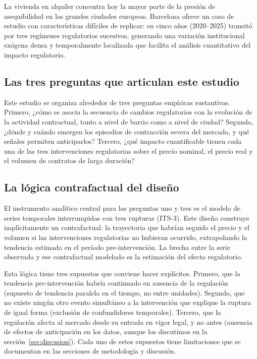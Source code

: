 \documentclass[10pt,a4paper,twocolumn]{article}
\begin{document}
La vivienda en alquiler concentra hoy la mayor parte de la presión de asequibilidad
en las grandes ciudades europeas. Barcelona ofrece un caso de estudio con características
difíciles de replicar: en cinco años (2020--2025) transitó por tres regímenes regulatorios
sucesivos, generando una variación institucional exógena densa y temporalmente localizada
que facilita el análisis cuantitativo del impacto regulatorio.

\subsection*{Las tres preguntas que articulan este estudio}

Este estudio se organiza alrededor de tres preguntas 
empíricas sustantivas. Primero, ¿cómo se asocia la secuencia de
cambios regulatorios con la evolución de la actividad contractual, tanto a nivel de
barrio como a nivel de ciudad? Segundo, ¿dónde y cuándo emergen los episodios de
contracción severa del mercado, y qué señales permiten anticiparlos? Tercero,
¿qué impacto cuantificable tienen cada una de las tres intervenciones regulatorias
sobre el precio nominal, el precio real y el volumen de contratos de larga duración?

\subsection*{La lógica contrafactual del diseño}

El instrumento analítico central para las preguntas uno y tres es el modelo de
series temporales interrumpidas con tres rupturas (ITS-3). Este diseño construye
implícitamente un contrafactual: la trayectoria que habrían seguido el precio y el
volumen si las intervenciones regulatorias no hubieran ocurrido, extrapolando la
tendencia estimada en el período pre-intervención. La brecha entre la serie observada
y ese contrafactual modelado es la estimación del efecto regulatorio.

Esta lógica tiene tres supuestos que conviene hacer explícitos. Primero, que la
tendencia pre-intervención habría continuado en ausencia de la regulación (supuesto
de tendencia paralela en el tiempo, no entre unidades). Segundo, que no existe
ningún otro evento simultáneo a la intervención que explique la ruptura de igual
forma (exclusión de confundidores temporales). Tercero, que la regulación afecta
al mercado desde su entrada en vigor legal, y no antes (ausencia de efectos de
anticipación en los datos, aunque los discutimos en la sección~\ref{sec:discusion}).
Cada uno de estos supuestos tiene limitaciones que se documentan en las secciones
de metodología y discusión.
\end{document}
